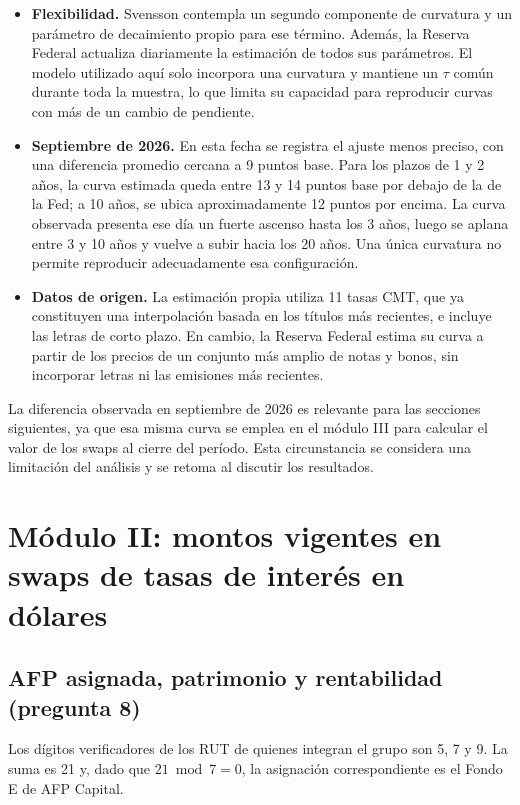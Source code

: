 \documentclass[11pt,letterpaper]{article}
\begin{document}
\begin{itemize}[leftmargin=*]
\item \textbf{Flexibilidad.} Svensson contempla un segundo componente de curvatura y un parámetro de decaimiento propio para ese término. Además, la Reserva Federal actualiza diariamente la estimación de todos sus parámetros. El modelo utilizado aquí solo incorpora una curvatura y mantiene un $\tau$ común durante toda la muestra, lo que limita su capacidad para reproducir curvas con más de un cambio de pendiente.
\item \textbf{Septiembre de 2026.} En esta fecha se registra el ajuste menos preciso, con una diferencia promedio cercana a 9 puntos base. Para los plazos de 1 y 2 años, la curva estimada queda entre 13 y 14 puntos base por debajo de la de la Fed; a 10 años, se ubica aproximadamente 12 puntos por encima. La curva observada presenta ese día un fuerte ascenso hasta los 3 años, luego se aplana entre 3 y 10 años y vuelve a subir hacia los 20 años. Una única curvatura no permite reproducir adecuadamente esa configuración.
\item \textbf{Datos de origen.} La estimación propia utiliza 11 tasas CMT, que ya constituyen una interpolación basada en los títulos más recientes, e incluye las letras de corto plazo. En cambio, la Reserva Federal estima su curva a partir de los precios de un conjunto más amplio de notas y bonos, sin incorporar letras ni las emisiones más recientes.
\end{itemize}

La diferencia observada en septiembre de 2026 es relevante para las secciones siguientes, ya que esa misma curva se emplea en el módulo III para calcular el valor de los swaps al cierre del período. Esta circunstancia se considera una limitación del análisis y se retoma al discutir los resultados.

\section{Módulo II: montos vigentes en swaps de tasas de interés en dólares}

\subsection{AFP asignada, patrimonio y rentabilidad (pregunta 8)}

Los dígitos verificadores de los RUT de quienes integran el grupo son 5, 7 y 9. La suma es 21 y, dado que $21 \bmod 7 = 0$, la asignación correspondiente es el Fondo E de AFP Capital.
\end{document}
